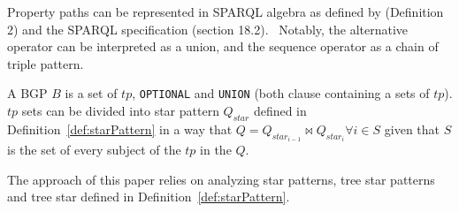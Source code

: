 Property paths can be represented in SPARQL algebra as defined by \citeauthor{Kostylev2015} (Definition 2) and the SPARQL specification (section 18.2).~
Notably, the alternative operator can be interpreted as a union, and the sequence operator as a chain of triple pattern.

\begin{definition}[BGP]\label{def:bgp}
 A BGP $B$ is a set of $tp$, \texttt{OPTIONAL} and \texttt{UNION} (both clause containing a sets of $tp$).
 $tp$ sets can be divided into star pattern $Q_{star}$ defined in Definition~\ref{def:starPattern} in a way 
 that $Q = Q_{star_{i-1}} \bowtie Q_{star_i} \forall i \in S$ given that $S$ is the set of every subject of the $tp$ in the $Q$.
\end{definition}
\fi

The approach  of this paper relies on analyzing star patterns, tree star patterns and tree star defined in Definition~\ref{def:starPattern}.

